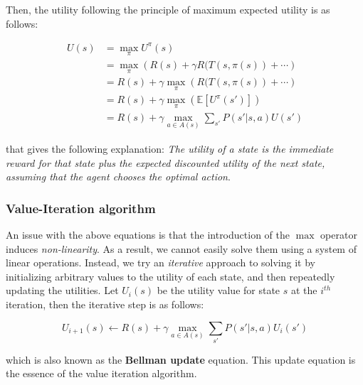 \documentclass[11pt]{article}
\begin{document}
Then, the utility following the principle of maximum expected utility is as follows:

$$
\begin{aligned}
U(s) &= \max_{\pi} U^{\pi}(s)\\ 
&= \max_{\pi}\left( R(s) + \gamma R(T(s, \pi(s)) + \cdots \right)\\
&= R(s) + \gamma \max_{\pi}\left(R(T(s, \pi(s)) + \cdots \right)\\
&= R(s) + \gamma \max_{\pi}\left( \mathbb{E}[U^{\pi}(s')] \right)\\
&= R(s) + \gamma \underset{a \in A(s)}{\max} \sum_{s'} P(s' | s, a) U(s')
\end{aligned}
$$

that gives the following explanation: \textit{The utility of a state is the immediate reward for that state plus the expected discounted utility of the next state, assuming that the agent chooses the optimal action}.

\subsubsection{Value-Iteration algorithm}

An issue with the above equations is that the introduction of the $\max$ operator induces \textit{non-linearity}. As a result, we cannot easily solve them using a system of linear operations. Instead, we try an \textit{iterative} approach to solving it by initializing arbitrary values to the utility of each state, and then repeatedly updating the utilities. Let $U_i(s)$ be the utility value for state $s$ at the $i^{th}$ iteration, then the iterative step is as follows:

$$
U_{i+1}(s) \leftarrow R(s) + \gamma \underset{a \in A(s)}{\max} \sum_{s'} P(s' | s, a) U_i(s')
$$

which is also known as the \textbf{Bellman update} equation. This update equation is the essence of the value iteration algorithm.
\end{document}

